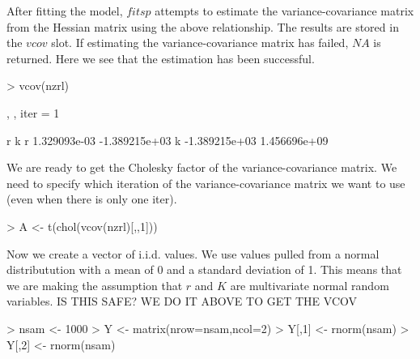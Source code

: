 \documentclass[a4paper]{article}
\begin{document}
After fitting the model, $fitsp$ attempts to estimate the variance-covariance matrix from the Hessian matrix using the above relationship. The results are stored in the $vcov$ slot. If estimating the variance-covariance matrix has failed, $NA$ is returned. Here we see that the estimation has been successful.
\begin{center}
\begin{minipage}[H]{0.95\textwidth}%
\begin{shaded}%
\begin{Schunk}
\begin{Sinput}
> vcov(nzrl)
\end{Sinput}
\begin{Soutput}
, , iter = 1

   
                r             k
  r  1.329093e-03 -1.389215e+03
  k -1.389215e+03  1.456696e+09
\end{Soutput}
\end{Schunk}
\end{shaded}%
\end{minipage}
\end{center}

We are ready to get the Cholesky factor of the variance-covariance matrix. We need to specify which iteration of the variance-covariance matrix we want to use (even when there is only one iter).
\begin{center}
\begin{minipage}[H]{0.95\textwidth}%
\begin{shaded}%
\begin{Schunk}
\begin{Sinput}
> A <- t(chol(vcov(nzrl)[,,1]))
\end{Sinput}
\end{Schunk}
\end{shaded}%
\end{minipage}
\end{center}

Now we create a vector of i.i.d. values. We use values pulled from a normal distributution with a mean of 0 and a standard deviation of 1. This means that we are making the assumption that $r$ and $K$ are multivariate normal random variables.
IS THIS SAFE? WE DO IT ABOVE TO GET THE VCOV  

\begin{center}
\begin{minipage}[H]{0.95\textwidth}%
\begin{shaded}%
\begin{Schunk}
\begin{Sinput}
> nsam <- 1000
> Y <- matrix(nrow=nsam,ncol=2)
> Y[,1] <- rnorm(nsam)
> Y[,2] <- rnorm(nsam)
\end{Sinput}
\end{Schunk}
\end{shaded}%
\end{minipage}
\end{center}
\end{document}
